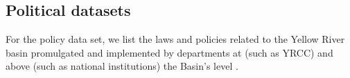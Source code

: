 \documentclass[9pt,twoside,lineno]{pnas-new}
\begin{document}
\subsection*{Political datasets}
For the policy data set, we list the laws and policies related to the Yellow River basin promulgated and implemented by departments at (such as YRCC) and above (such as national institutions) the Basin's level  \cite{yellowriverconservancycommissionYellowRiverBasin2013}.


\newpage
\end{document}
